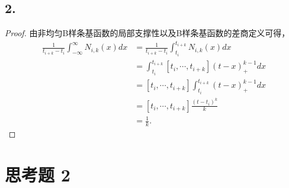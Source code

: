 \documentclass[utf8]{ctexart}
\begin{document}
\subsection*{2.}
\begin{proof}
    由非均匀B样条基函数的局部支撑性以及B样条基函数的差商定义可得，
    \begin{equation}
        \begin{aligned}
            \frac{1}{t_{i+k}-t_i}\int_{-\infty}^{\infty}N_{i,k}(x)dx &=  \frac{1}{t_{i+k}-t_i}\int_{t_{i}}^{t_{i+k}}N_{i,k}(x)dx\\
            &= \int_{t_{i}}^{t_{i+k}}[t_i,\cdots,t_{i+k}](t-x)_+^{k-1}dx\\
            &= [t_i,\cdots,t_{i+k}]\int_{t_{i}}^{t_{i+k}}(t-x)_+^{k-1}dx\\
            &= [t_i,\cdots,t_{i+k}]\frac{(t-t_i)^k}{k}\\
            &= \frac{1}{k}.
        \end{aligned}
    \end{equation}
\end{proof}

\section*{思考题 2}
\end{document}
